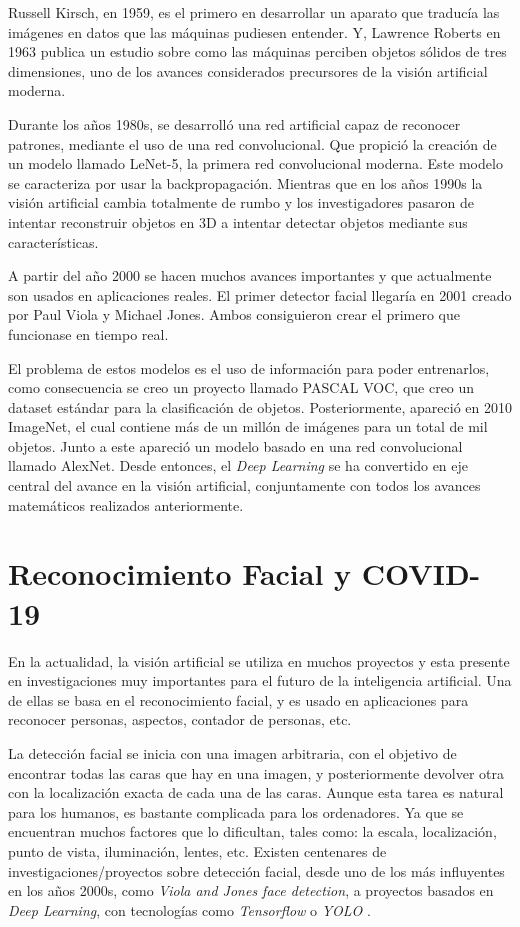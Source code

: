 Russell Kirsch, en 1959, es el primero en desarrollar un aparato que traducía las imágenes en datos que las máquinas pudiesen entender. Y, Lawrence Roberts en 1963 publica un estudio sobre como las máquinas perciben objetos sólidos de tres dimensiones, uno de los avances considerados precursores de la visión artificial moderna.

Durante los años 1980s, se desarrolló una red artificial capaz de reconocer patrones, mediante el uso de una red convolucional. Que propició la creación de un modelo llamado LeNet-5, la primera red convolucional moderna. Este modelo se caracteriza por usar la backpropagación. Mientras que en los años 1990s la visión artificial cambia totalmente de rumbo y los investigadores pasaron de intentar reconstruir objetos en 3D a intentar detectar objetos mediante sus características.

A partir del año 2000 se hacen muchos avances importantes y que actualmente son usados en aplicaciones reales. El primer detector facial llegaría en 2001 creado por Paul Viola y Michael Jones. Ambos consiguieron crear el primero que funcionase en tiempo real.

El problema de estos modelos es el uso de información para poder entrenarlos, como consecuencia se creo un proyecto llamado PASCAL VOC, que creo un dataset estándar para la clasificación de objetos. Posteriormente, apareció en 2010 ImageNet, el cual contiene más de un millón de imágenes para un total de mil objetos. Junto a este apareció un modelo basado en una red convolucional llamado AlexNet. Desde entonces, el \textit{Deep Learning} se ha convertido en eje central del avance en la visión artificial, conjuntamente con todos los avances matemáticos realizados anteriormente.

\section{Reconocimiento Facial y COVID-19}

En la actualidad, la visión artificial se utiliza en muchos proyectos y esta presente en investigaciones muy importantes para el futuro de la inteligencia artificial. Una de ellas se basa en el reconocimiento facial, y es usado en aplicaciones para reconocer personas, aspectos, contador de personas, etc. 

La detección facial se inicia con una imagen arbitraria, con el objetivo de encontrar todas las caras que hay en una imagen, y posteriormente devolver otra con la localización exacta de cada una de las caras. Aunque esta tarea es natural para los humanos, es bastante complicada para los ordenadores. Ya que se encuentran muchos factores que lo dificultan, tales como: la escala, localización, punto de vista, iluminación, lentes, etc. Existen centenares de investigaciones/proyectos sobre detección facial, desde uno de los más influyentes en los años 2000s, como \textit{Viola and Jones face detection}, a proyectos basados en \textit{Deep Learning}, con tecnologías como \textit{Tensorflow} o \textit{YOLO} \cite{szeliski_2018}. 

